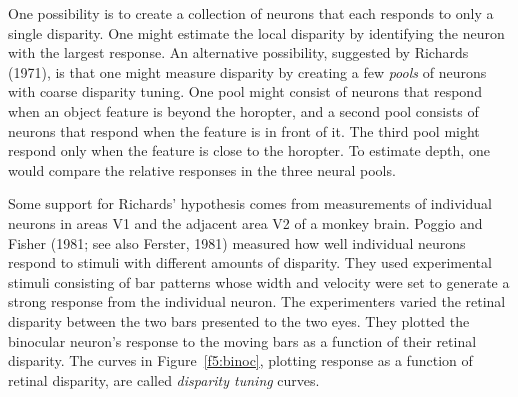One possibility is to create a collection
of neurons that each responds to only a single disparity.
One might estimate the local disparity by identifying
the neuron with the largest response.
An alternative possibility,
suggested by Richards (1971),
is that one might measure
disparity by creating a few {\em pools} of neurons with
coarse disparity tuning.
One pool might consist of neurons
that respond when an object feature
is beyond the horopter,
and a second pool consists of neurons
that respond when the feature is in front of it.
The third pool might respond only when the feature is close
to the horopter.
To estimate depth, one would compare the relative
responses in the three neural pools.

Some support for Richards' hypothesis comes from
measurements of individual neurons
in areas V1 and the adjacent area V2 of a monkey brain.
Poggio and Fisher (1981; see also Ferster, 1981) measured
how well individual neurons
respond to stimuli with different amounts of disparity.
They used experimental stimuli consisting
of bar patterns whose width
and velocity were set to generate a strong
response from the individual neuron.
The experimenters varied the retinal disparity between
the two bars presented to the two eyes.
They plotted the binocular neuron's response 
to the moving bars as a function of their retinal disparity.
The curves in Figure~\ref{f5:binoc}, plotting
response as a function of retinal disparity,
are called {\em disparity tuning} curves.

